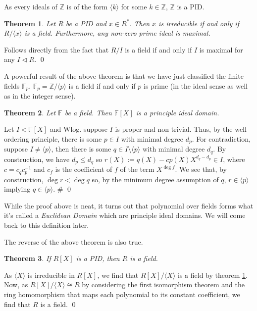 \documentclass[
]{article}
\newtheorem{theorem}{Theorem}
\begin{document}
As every ideals of \(\mathbb{Z}\) is of the form \(\langle k \rangle\)
for some \(k \in \mathbb{Z}\), \(\mathbb{Z}\) is a PID.

\begin{theorem}\label{quotient_principle_has_inv_iff}
  Let \(R\) be a PID and \(x \in R^*\). Then \(x\) is irreducible if and only if 
  \(R / \langle x \rangle\) is a field. Furthermore, any non-zero prime ideal is 
  maximal.
\end{theorem}
\proof

Follows directly from the fact that \(R / I\) is a field if and only if
\(I\) is maximal for any \(I \triangleleft R\). \qed

A powerful result of the above theorem is that we have just classified
the finite fields \(\mathbb{F}_p\).
\(\mathbb{F}_p = \mathbb{Z} / \langle p \rangle\) is a field if and only
if \(p\) is prime (in the ideal sense as well as in the integer sense).

\begin{theorem}
  Let \(\mathbb{F}\) be a field. Then \(\mathbb{F}[X]\) is a principle ideal 
  domain.
\end{theorem}
\proof

Let \(I \triangleleft \mathbb{F}[X]\) and Wlog. suppose \(I\) is proper
and non-trivial. Thus, by the well-ordering principle, there is some
\(p \in I\) with minimal degree \(d_p\). For contradiction, suppose
\(I \neq \langle p \rangle\), then there is some
\(q \in I \setminus \langle p \rangle\) with minimal degree \(d_q\). By
construction, we have \(d_p \le d_q\) so
\(r(X) := q(X) - c p(X) X^{d_q - d_p} \in I\), where
\(c = c_q c_p^{-1}\) and \(c_f\) is the coefficient of \(f\) of the term
\(X^{\deg f}\). We see that, by construction, \(\deg r < \deg q\) so, by
the minimum degree assumption of \(q\), \(r \in \langle p \rangle\)
implying \(q \in \langle p \rangle\). \# \qed

While the proof above is neat, it turns out that polynomial over fields
forms what it's called a \emph{Euclidean Domain} which are principle
ideal domains. We will come back to this definition later.

The reverse of the above theorem is also true.

\begin{theorem}
  If \(R[X]\) is a PID, then \(R\) is a field.
\end{theorem}
\proof

As \(\langle X \rangle\) is irreducible in \(R[X]\), we find that
\(R[X] / \langle X \rangle\) is a field by theorem
\ref{quotient_principle_has_inv_iff}. Now, as
\(R[X] / \langle X \rangle \cong R\) by considering the first
isomorphism theorem and the ring homomorphism that maps each polynomial
to its constant coefficient, we find that \(R\) is a field. \qed
\end{document}
